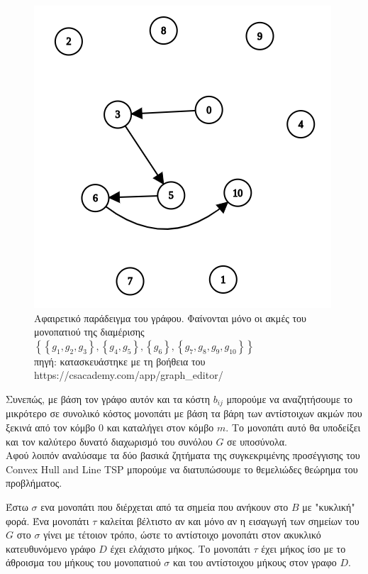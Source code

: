 \documentclass[oneside,12pt]{book}
\newenvironment{matlab}
	{\begin{figure}[hp]\centering\captionsetup{justification=centering}}
	{\end{figure}}
\theoremstyle{definition}
\begin{document}
\begin{matlab}
	\includegraphics[scale=0.5]{images/graph.png}
	\caption{Αφαιρετικό παράδειγμα του γράφου. Φαίνονται μόνο οι ακμές του μονοπατιού της διαμέρισης \(\left\{ \left\{ g_1,g_2,g_3 \right\}, \left\{ g_4,g_5 \right\}, \left\{ g_6 \right\}, \left\{ g_7,g_8,g_9, g_{10} \right\}\right\}\) \\ πηγή: κατασκευάστηκε με τη βοήθεια του https://csacademy.com/app/graph\_editor/}
\end{matlab}

Συνεπώς, με βάση τον γράφο αυτόν και τα κόστη \(b_{ij}\) μπορούμε να αναζητήσουμε το μικρότερο σε συνολικό κόστος μονοπάτι με βάση τα βάρη των αντίστοιχων ακμών που ξεκινά από τον κόμβο 0 και καταλήγει στον κόμβο \(m\). Το μονοπάτι αυτό θα υποδείξει και τον καλύτερο δυνατό διαχωρισμό του συνόλου \(G\) σε υποσύνολα. \\

Αφού λοιπόν αναλύσαμε τα δύο βασικά ζητήματα της συγκεκριμένης προσέγγισης του Convex Hull and Line TSP μπορούμε να διατυπώσουμε το θεμελιώδες θεώρημα του προβλήματος. \\

\begin{mytheorem}{}{}
	Έστω \(σ\) ενα μονοπάτι που διέρχεται από τα σημεία που ανήκουν στο \(B\) με "κυκλική" φορά. Ένα μονοπάτι \(τ\) καλείται βέλτιστο αν και μόνο αν η εισαγωγή των σημείων του \(G\) στο \(σ\) γίνει με τέτοιον τρόπο, ώστε το αντίστοιχο μονοπάτι στον ακυκλικό κατευθυνόμενο γράφο \(D\) έχει ελάχιστο μήκος. Το μονοπάτι \(τ\) έχει μήκος ίσο με το άθροισμα του μήκους του μονοπατιού \(σ\) και του αντίστοιχου μήκους στον γραφο \(D\). 
\end{mytheorem}
\end{document}
